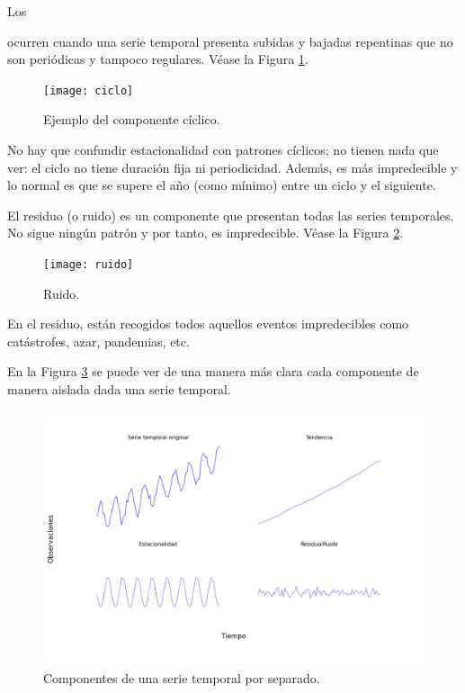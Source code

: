 Los {\hypertarget{ciclo}{} ocurren cuando una serie temporal presenta subidas y bajadas repentinas que no son periódicas y tampoco regulares. Véase la Figura \ref{ciclo}.
	\begin{figure}[H]
		\centering
		\texttt{[image: ciclo]}
		\caption{Ejemplo del componente cíclico.}
		\label{ciclo}
	\end{figure}
	
No hay que confundir estacionalidad con patrones cíclicos; no tienen nada que ver: el ciclo no tiene duración fija ni periodicidad. Además, es más impredecible y lo normal es que se supere el año (como mínimo) entre un ciclo y el siguiente.

\bigskip


El residuo (o ruido) es un componente que presentan todas las series temporales. No sigue ningún patrón y por tanto, es impredecible. Véase la Figura \ref{ruido}.

\begin{figure}[H]
	\centering
	\texttt{[image: ruido]}
	\caption{Ruido.}
	\label{ruido}
\end{figure}

En el residuo, están recogidos todos aquellos eventos impredecibles como catástrofes, azar, pandemias, etc.

En la Figura \ref{components} se puede ver de una manera más clara cada componente de manera aislada dada una serie temporal\fnm.

\begin{figure}[H]
    \centering
    \includegraphics[scale = 0.4]{imgs/componentes.png}
    \caption{Componentes de una serie temporal por separado.}
    \label{components}
\end{figure}
\bigskip

}
